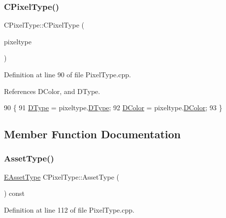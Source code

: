 \subsubsection{\texorpdfstring{C\+Pixel\+Type()}{CPixelType()}\hspace{0.1cm}{\footnotesize\ttfamily [4/4]}}
{\footnotesize\ttfamily C\+Pixel\+Type\+::\+C\+Pixel\+Type (\begin{DoxyParamCaption}\item[{const \hyperlink{classCPixelType}{C\+Pixel\+Type} \&}]{pixeltype }\end{DoxyParamCaption})}



Definition at line 90 of file Pixel\+Type.\+cpp.



References D\+Color, and D\+Type.


\begin{DoxyCode}
90                                                  \{
91     \hyperlink{classCPixelType_aca37f042b510a349e0d3209c73ae51c5}{DType} = pixeltype.\hyperlink{classCPixelType_aca37f042b510a349e0d3209c73ae51c5}{DType};
92     \hyperlink{classCPixelType_a474243cf748aee94cfa207659e940b6c}{DColor} = pixeltype.\hyperlink{classCPixelType_a474243cf748aee94cfa207659e940b6c}{DColor};
93 \}
\end{DoxyCode}


\subsection{Member Function Documentation}
\hypertarget{classCPixelType_addcf6c6d11e8ebafe4455beaa995b675}{}\label{classCPixelType_addcf6c6d11e8ebafe4455beaa995b675} 
\subsubsection{\texorpdfstring{Asset\+Type()}{AssetType()}}
{\footnotesize\ttfamily \hyperlink{GameDataTypes_8h_a5600d4fc433b83300308921974477fec}{E\+Asset\+Type} C\+Pixel\+Type\+::\+Asset\+Type (\begin{DoxyParamCaption}{ }\end{DoxyParamCaption}) const}



Definition at line 112 of file Pixel\+Type.\+cpp.



